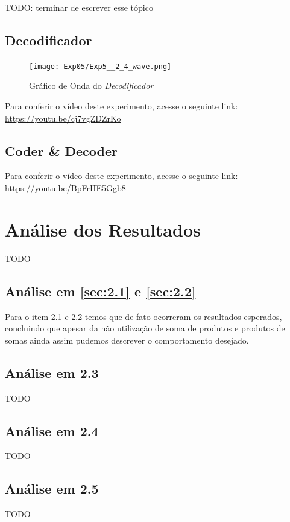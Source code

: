 \documentclass[12pt]{article}
\begin{document}
TODO: terminar de escrever esse tópico

\subsection{Decodificador}\label{sec:2.4}

\begin{figure}[htp]
    \centering
    \texttt{[image: Exp05/Exp5\_\_2\_4\_wave.png]}
    \caption{Gráfico de Onda do \emph{Decodificador}}
    \label{fig:Exp5__2_4_wave.png}
\end{figure}

Para conferir o vídeo deste experimento, acesse o seguinte link:
\href{https://youtu.be/cj7vgZDZrKo}{https://youtu.be/cj7vgZDZrKo}

\subsection{Coder \& Decoder}\label{sec:2.5}

Para conferir o vídeo deste experimento, acesse o seguinte link:
\href{https://youtu.be/BpFrHE5Ggb8}{https://youtu.be/BpFrHE5Ggb8}

\section{Análise dos Resultados}
\label{sec:resultados}
TODO

\subsection{Análise em \ref{sec:2.1} e \ref{sec:2.2}}\label{sec:analise2.1}

Para o item 2.1 e 2.2 temos que de fato ocorreram os resultados esperados,
concluindo que apesar da não utilização de soma de produtos e produtos de somas
ainda assim pudemos descrever o comportamento desejado.

\subsection{Análise em 2.3}\label{sec:analise2.2}
TODO

\subsection{Análise em 2.4}\label{sec:analise2.2}
TODO

\subsection{Análise em 2.5}\label{sec:analise2.2}
TODO
\end{document}
